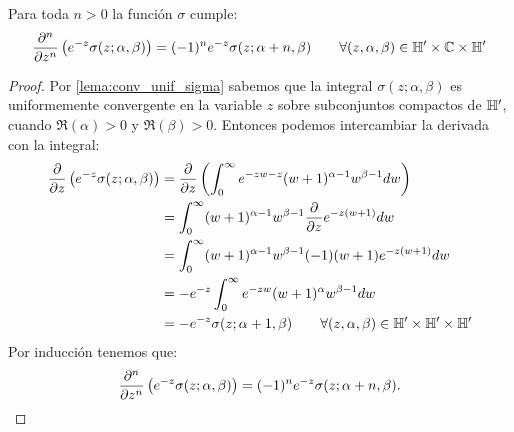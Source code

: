 \documentclass[../../tesis_maestria]{subfiles}
\begin{document}
\begin{lema}\label{lema:derivar_sigma}%
  Para toda $n>0$ la funci\'on $\sigma$ cumple:
  \[
    \frac{\partial^n}{\partial z^n}\left( e^{-z}\sigma(z;\alpha,\beta) \right)=
    (-1)^ne^{-z}\sigma(z;\alpha+n,\beta) \qquad \forall(z,\alpha,\beta)\in\mathbb{H}'\times\mathbb{C}\times\mathbb{H}'
  \]
\end{lema}%
\begin{proof}
Por \ref{lema:conv_unif_sigma} sabemos que la integral $\sigma(z;\alpha,\beta)$ es uniformemente
convergente en la variable $z$ sobre subconjuntos compactos de $\mathbb{H}'$, cuando $\Re(\alpha)>0$ y
$\Re(\beta)>0$. Entonces podemos intercambiar la derivada con la integral:
\begin{align*}
  \frac{\partial}{\partial z}\left( e^{-z}\sigma(z;\alpha,\beta) \right)
  &=\frac{\partial}{\partial z}\left( \int_0^{\infty}e^{-zw-z}(w+1)^{\alpha-1}w^{\beta-1}dw \right)\\
  &=\int_0^{\infty}(w+1)^{\alpha-1}w^{\beta-1}\frac{\partial}{\partial z}e^{-z(w+1)}dw\\
  &=\int_0^{\infty}(w+1)^{\alpha-1}w^{\beta-1}(-1)(w+1)e^{-z(w+1)}dw\\
  &=-e^{-z}\int_0^{\infty}e^{-zw}(w+1)^{\alpha}w^{\beta-1}dw\\
  &=-e^{-z}\sigma(z;\alpha+1,\beta) \qquad \forall (z,\alpha,\beta)\in\mathbb{H}'\times\mathbb{H}'\times\mathbb{H}'
\end{align*}
Por inducci\'on tenemos que:
\[
  \frac{\partial^n}{\partial z^n}\left( e^{-z}\sigma(z;\alpha,\beta) \right)=
  (-1)^ne^{-z}\sigma(z;\alpha+n,\beta).
\]
\end{proof}
\end{document}
